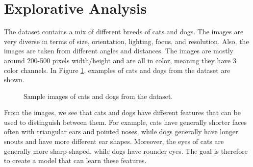 \section{Explorative Analysis}
The dataset contains a mix of different breeds of cats and dogs.
The images are very diverse in terms of size, orientation, lighting, focus, and resolution.
Also, the images are taken from different angles and distances.
The images are mostly around 200-500 pixels width/height and are all in color, meaning they have 3 color channels.
In Figure \ref{fig:cats_dogs}, examples of cats and dogs from the dataset are shown.
\begin{figure}[H]
    \vspace*{-0.7cm}
    \centering
    \hspace{0.4cm}
    \caption{Sample images of cats and dogs from the dataset.}
    \label{fig:cats_dogs}
    \vspace*{-0.7cm}
\end{figure}

From the images, we see that cats and dogs have different features that can be used to distinguish between them.
For example, cats have generally shorter faces often with triangular ears and pointed noses,
while dogs generally have longer snouts and have more different ear shapes.
Moreover, the eyes of cats are generally more sharp-shaped, while dogs have rounder eyes. The goal is therefore to create a model that can learn these features.